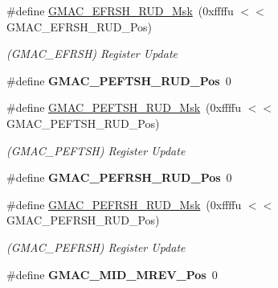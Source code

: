 \begin{DoxyCompactItemize}
\#define \mbox{\hyperlink{group__SAMV71__GMAC_ga2b91b72e0bfe89afa1c3144bf5a6959a}{G\+M\+A\+C\+\_\+\+E\+F\+R\+S\+H\+\_\+\+R\+U\+D\+\_\+\+Msk}}~(0xffffu $<$$<$ G\+M\+A\+C\+\_\+\+E\+F\+R\+S\+H\+\_\+\+R\+U\+D\+\_\+\+Pos)
\begin{DoxyCompactList}\small\item\em (G\+M\+A\+C\+\_\+\+E\+F\+R\+SH) Register Update \end{DoxyCompactList}\item 
\mbox{\label{group__SAMV71__GMAC_ga3e5721b1400560d0b079ff48d76c7712}} 
\#define {\bfseries G\+M\+A\+C\+\_\+\+P\+E\+F\+T\+S\+H\+\_\+\+R\+U\+D\+\_\+\+Pos}~0
\item 
\mbox{\label{group__SAMV71__GMAC_ga4e9f164a14617a3fc6c2b968d3aa92a9}} 
\#define \mbox{\hyperlink{group__SAMV71__GMAC_ga4e9f164a14617a3fc6c2b968d3aa92a9}{G\+M\+A\+C\+\_\+\+P\+E\+F\+T\+S\+H\+\_\+\+R\+U\+D\+\_\+\+Msk}}~(0xffffu $<$$<$ G\+M\+A\+C\+\_\+\+P\+E\+F\+T\+S\+H\+\_\+\+R\+U\+D\+\_\+\+Pos)
\begin{DoxyCompactList}\small\item\em (G\+M\+A\+C\+\_\+\+P\+E\+F\+T\+SH) Register Update \end{DoxyCompactList}\item 
\mbox{\label{group__SAMV71__GMAC_ga0b653a631aad2e25afda4a459eabd681}} 
\#define {\bfseries G\+M\+A\+C\+\_\+\+P\+E\+F\+R\+S\+H\+\_\+\+R\+U\+D\+\_\+\+Pos}~0
\item 
\mbox{\label{group__SAMV71__GMAC_ga84b058029b46048368f182fadfbedba2}} 
\#define \mbox{\hyperlink{group__SAMV71__GMAC_ga84b058029b46048368f182fadfbedba2}{G\+M\+A\+C\+\_\+\+P\+E\+F\+R\+S\+H\+\_\+\+R\+U\+D\+\_\+\+Msk}}~(0xffffu $<$$<$ G\+M\+A\+C\+\_\+\+P\+E\+F\+R\+S\+H\+\_\+\+R\+U\+D\+\_\+\+Pos)
\begin{DoxyCompactList}\small\item\em (G\+M\+A\+C\+\_\+\+P\+E\+F\+R\+SH) Register Update \end{DoxyCompactList}\item 
\mbox{\label{group__SAMV71__GMAC_ga0ad9c1f14264dd6f851064549c031156}} 
\#define {\bfseries G\+M\+A\+C\+\_\+\+M\+I\+D\+\_\+\+M\+R\+E\+V\+\_\+\+Pos}~0
\item 
\mbox{\label{group__SAMV71__GMAC_ga54978b559ce64c5de9205c21362f361b}} 
$$
\end{DoxyCompactItemize}
